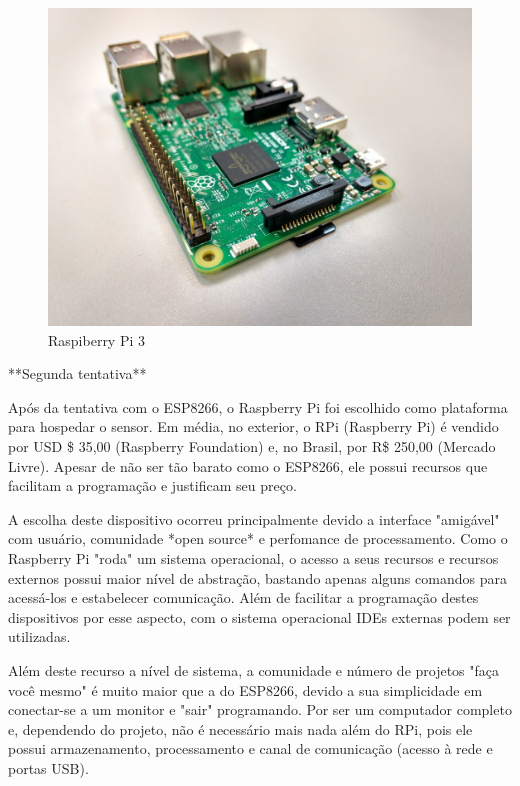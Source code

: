 \begin{figure}[htb]
	\caption{\label{fig:rpi-3}Raspiberry Pi 3 }
	\begin{center}
		\includegraphics[width=1\textwidth]{040-plataformas/RPi-WiFi-dongles/rpi-onboard.jpg}
	\end{center}
\end{figure}

**Segunda tentativa**

Após da tentativa com o ESP8266, o Raspberry Pi foi escolhido como plataforma
para hospedar o sensor. Em média, no exterior, o RPi (Raspberry Pi) é vendido
por USD \$ 35,00 (Raspberry Foundation) e, no Brasil, por R\$ 250,00 (Mercado Livre).
Apesar de não ser tão barato como o ESP8266, ele possui recursos que facilitam a
programação e justificam seu preço.

A escolha deste dispositivo ocorreu principalmente devido a interface "amigável"
com usuário, comunidade *open source* e perfomance de processamento. Como o
Raspberry Pi "roda" um sistema operacional, o acesso a seus recursos e recursos
externos possui maior nível de abstração, bastando apenas alguns comandos para
acessá-los e estabelecer comunicação. Além de facilitar a programação destes
dispositivos por esse aspecto, com o sistema operacional IDEs externas podem ser
utilizadas.

Além deste recurso a nível de sistema, a comunidade e número de projetos "faça
você mesmo" é muito maior que a do ESP8266, devido a sua simplicidade em
conectar-se a um monitor e "sair" programando. Por ser um computador completo e,
dependendo do projeto, não é necessário mais nada além do RPi, pois ele possui
armazenamento, processamento e canal de comunicação (acesso à rede e portas
USB).

